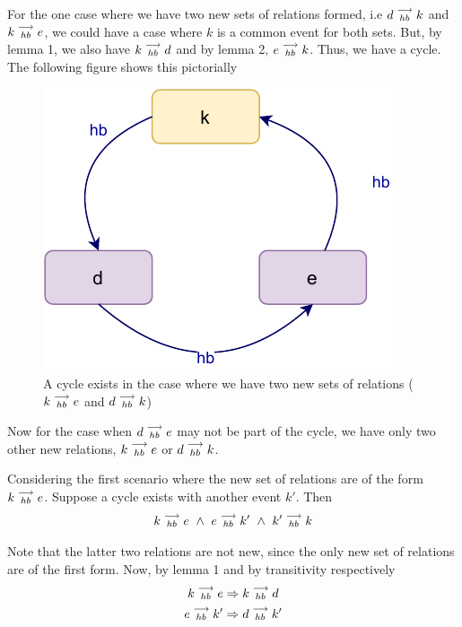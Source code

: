     For the one case where we have two new sets of relations formed, i.e $d\stackrel{\longrightarrow}{_{hb}}k$ and $k\stackrel{\longrightarrow}{_{hb}}e$, we could have a case where $k$ is a common event for both sets. But, by lemma 1, we also have $k\stackrel{\longrightarrow}{_{hb}}d$ and by lemma 2, $e\stackrel{\longrightarrow}{_{hb}}k$. Thus, we have a cycle. The following figure shows this pictorially

    \begin{figure}[H]
        \centering
        \includegraphics[scale=0.7]{Q4(a)_3.pdf}
        \caption{A cycle exists in the case where we have two new sets of relations ($k\stackrel{\longrightarrow}{_{hb}}e$ and $d\stackrel{\longrightarrow}{_{hb}}k$) }
        \label{fig:my_label}
    \end{figure}



    Now for the case when $d\stackrel{\longrightarrow}{_{hb}}e$ may not be part of the cycle, we have only two other new relations, $k\stackrel{\longrightarrow}{_{hb}}e$ or $d\stackrel{\longrightarrow}{_{hb}}k$.

    Considering the first scenario where the new set of relations are of the form $k\stackrel{\longrightarrow}{_{hb}}e$. Suppose a cycle exists with another event $k'$. Then 
    \[
        k\stackrel{\longrightarrow}{_{hb}}e \ \wedge \
        e\stackrel{\longrightarrow}{_{hb}}k' \ \wedge \
        k'\stackrel{\longrightarrow}{_{hb}}k
    \]

    Note that the latter two relations are not new, since the only new set of relations are of the first form. Now, by lemma 1 and by transitivity respectively
    \begin{gather*}
        k\stackrel{\longrightarrow}{_{hb}}e \Rightarrow k\stackrel{\longrightarrow}{_{hb}}d \\
        e\stackrel{\longrightarrow}{_{hb}}k' \Rightarrow d\stackrel{\longrightarrow}{_{hb}}k'    
    \end{gather*}

